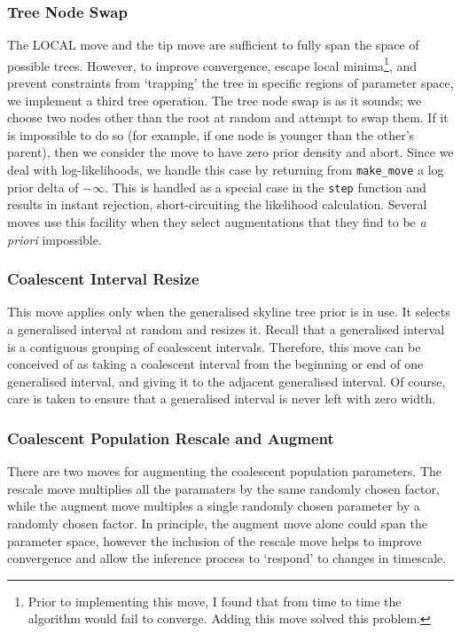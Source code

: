 \documentclass[10pt,journal,compsoc]{IEEEtran}
\begin{document}
\subsubsection{Tree Node Swap}
The LOCAL move and the tip move are sufficient to fully span the space of possible trees. However, to improve convergence, escape local minima\footnote{Prior to implementing this move, I found that from time to time the algorithm would fail to converge. Adding this move solved this problem.}, and prevent constraints from `trapping' the tree in specific regions of parameter space, we implement a third tree operation. The tree node swap is as it sounds; we choose two nodes other than the root at random and attempt to swap them. If it is impossible to do so (for example, if one node is younger than the other's parent), then we consider the move to have zero prior density and abort. Since we deal with log-likelihoods, we handle this case by returning from \texttt{make\_move} a log prior delta of $-\infty$. This is handled as a special case in the \texttt{step} function and results in instant rejection, short-circuiting the likelihood calculation. Several moves use this facility when they select augmentations that they find to be \textit{a priori} impossible.

\subsubsection{Coalescent Interval Resize}

This move applies only when the generalised skyline tree prior is in use. It selects a generalised interval at random and resizes it. Recall that a generalised interval is a contiguous grouping of coalescent intervals. Therefore, this move can be conceived of as taking a coalescent interval from the beginning or end of one generalised interval, and giving it to the adjacent generalised interval. Of course, care is taken to ensure that a generalised interval is never left with zero width.

\subsubsection{Coalescent Population Rescale and Augment}

There are two moves for augmenting the coalescent population parameters. The rescale move multiplies all the paramaters by the same randomly chosen factor, while the augment move multiples a single randomly chosen parameter by a randomly chosen factor. In principle, the augment move alone could span the parameter space, however the inclusion of the rescale move helps to improve convergence and allow the inference process to `respond' to changes in timescale.
\end{document}
